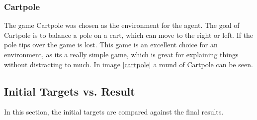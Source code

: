 \documentclass[10pt,a4paper]{article}
\begin{document}
		\subsubsection{Cartpole}
			The game Cartpole was chosen as the environment for the agent. The goal of Cartpole is to balance a pole on a cart, which can move to the right or left. If the pole tips over the game is lost. This game is an excellent choice for an environment, as its a really simple game, which is great for explaining things without distracting to much.
			In image \ref{cartpole} a round of Cartpole can be seen.
			
	\subsection{Initial Targets vs. Result}
	
		In this section, the initial targets are compared against the final results.
		
\end{document}
